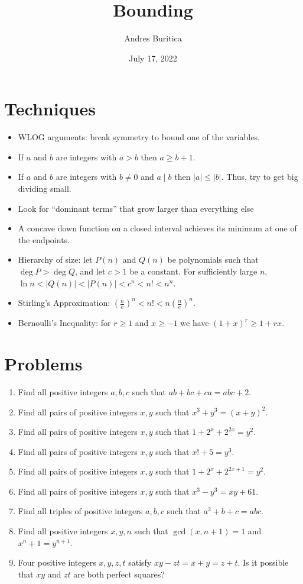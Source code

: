 \documentclass{article}
\title{Bounding}
\author{Andres Buritica}
\date{July 17, 2022}
\begin{document}
\maketitle
\section{Techniques}
\begin{itemize}
  \item WLOG arguments: break symmetry to bound one of the variables.
  \item If $a$ and $b$ are integers with $a>b$ then $a\ge b+1$.
  \item If $a$ and $b$ are integers with $b\ne 0$ and $a\mid b$ then
    $|a|\le|b|$. Thus, try to get big dividing small.
  \item Look for ``dominant terms'' that grow larger than everything else
  \item A concave down function on a closed interval
    achieves its minimum at one of the endpoints.
  \item Hierarchy of size: let $P(n)$ and $Q(n)$ be polynomials such that $\deg
    P>\deg Q$, and let $c>1$ be a constant. For sufficiently large $n$,
    $\ln n<|Q(n)|<|P(n)|<c^n<n!<n^n$.
  \item Stirling's Approximation: $\left(\frac ne\right)^n<n!<n\left(\frac
    ne\right)^n$.
  \item Bernoulli's Inequality: for $r\ge 1$ and $x\ge -1$ we have $(1+x)^r\ge
    1+rx$.
\end{itemize}
\section{Problems}
\begin{enumerate}
  \item Find all positive integers $a,b,c$ such that $ab+bc+ca=abc+2$.
  \item Find all pairs of positive integers $x,y$ such that $x^3+y^3=(x+y)^2$.
  \item Find all pairs of positive integers $x,y$ such that
    $1+2^x+2^{2x}=y^2$.
  \item Find all pairs of positive integers $x,y$ such that $x!+5=y^3$.
  \item Find all pairs of positive integers $x,y$ such that
    $1+2^x+2^{2x+1}=y^2$.
  \item Find all pairs of positive integers $x,y$ such that $x^3-y^3=xy+61$.
  \item Find all triples of positive integers $a,b,c$ such that $a^2+b+c=abc$.
  \item Find all positive integers $x,y,n$ such that $\gcd(x,n+1)=1$ and
    $x^n+1=y^{n+1}$.
  \item Four positive integers $x,y,z,t$ satisfy $xy-zt=x+y=z+t$. Is it possible
    that $xy$ and $zt$ are both perfect squares?
\end{enumerate}
\newpage
\end{document}
